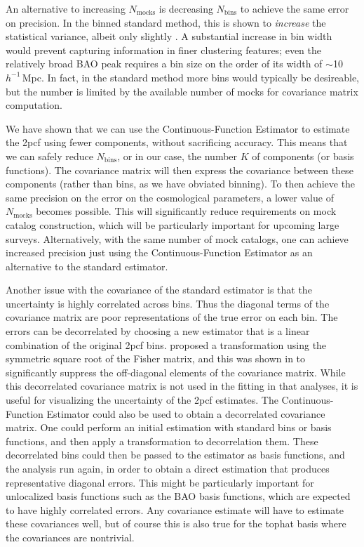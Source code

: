 \documentclass[modern]{aastex62}
\newcommand{\cf}{2pcf\xspace} %
\newcommand{\Est}{The Continuous-Function Estimator\xspace}
\newcommand{\est}{the Continuous-Function Estimator\xspace}
\newcommand{\hmpc}{$h^{-1}\,$Mpc}
\newcommand{\NN}[1]{N_\mathrm{#1}}
\begin{document}
An alternative to increasing $\NN{mocks}$ is decreasing $\NN{bins}$ to achieve the same error on precision.
In the binned standard method, this is shown to \emph{increase} the statistical variance, albeit only slightly \citep{Percival2014}.
A substantial increase in bin width would prevent capturing information in finer clustering features; even the relatively broad BAO peak requires a bin size on the order of its width of $\sim$10\hmpc.
In fact, in the standard method more bins would typically be desireable, but the number is limited by the available number of mocks for covariance matrix computation.

We have shown that we can use \est to estimate the \cf using fewer components, without sacrificing accuracy.
This means that we can safely reduce $\NN{bins}$, or in our case, the number $K$ of components (or basis functions).
The covariance matrix will then express the covariance between these components (rather than bins, as we have obviated binning).
To then achieve the same precision on the error on the cosmological parameters, a lower value of $\NN{mocks}$ becomes possible.
This will significantly reduce requirements on mock catalog construction, which will be particularly important for upcoming large surveys. 
Alternatively, with the same number of mock catalogs, one can achieve increased precision just using \est as an alternative to the standard estimator.

Another issue with the covariance of the standard estimator is that the uncertainty is highly correlated across bins.
Thus the diagonal terms of the covariance matrix are poor representations of the true error on each bin.
The errors can be decorrelated by choosing a new estimator that is a linear combination of the original \cf bins. 
\cite{Hamilton2000} proposed a transformation using the symmetric square root of the Fisher matrix, and this was shown in \cite{Anderson2014} to significantly suppress the off-diagonal elements of the covariance matrix.
While this decorrelated covariance matrix is not used in the fitting in that analyses, it is useful for visualizing the uncertainty of the \cf estimates.
\Est could also be used to obtain a decorrelated covariance matrix.
One could perform an initial estimation with standard bins or basis functions, and then apply a transformation to decorrelation them.
These decorrelated bins could then be passed to the estimator as basis functions, and the analysis run again, in order to obtain a direct estimation that produces representative diagonal errors.
This might be particularly important for unlocalized basis functions such as the BAO basis functions, which are expected to have highly correlated errors.
Any covariance estimate will have to estimate these covariances well, but of course this is also true for the tophat basis where the covariances are nontrivial.
\end{document}
